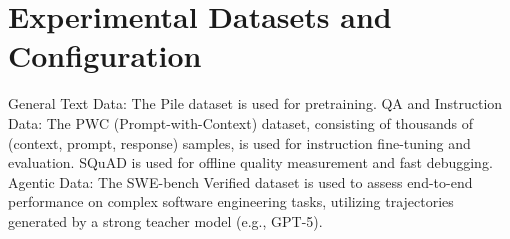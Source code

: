 \section{Experimental Datasets and Configuration}

General Text Data: The Pile dataset is used for pretraining. QA and Instruction Data: The PWC (Prompt-with-Context) dataset, consisting of thousands of (context, prompt, response) samples, is used for instruction fine-tuning and evaluation. SQuAD is used for offline quality measurement and fast debugging. Agentic Data: The SWE-bench Verified dataset is used to assess end-to-end performance on complex software engineering tasks, utilizing trajectories generated by a strong teacher model (e.g., GPT-5).
